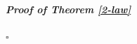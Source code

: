 \documentclass[10pt]{amsart}
\numberwithin{equation}{section}
\theoremstyle{plain}
\numberwithin{equation}{section}
\theoremstyle{definition}
\theoremstyle{remark}
\newenvironment{myproof}[2] {\paragraph{\emph{Proof of {#1} {#2} }}}{\hfill$\square$}
\def\ac{\mathrm{ac}}
\def\ur{\mathrm{ur}}
\def\ac{\mathrm{ac}}
\def\triplef{\underline{\mathbf{f}}}
\def\calO{\mathcal{O}}
\def\frakp{\mathfrak{p}}
\def\FF{\mathbf{F}}
\def\rmH{\mathrm{H}}
\def\rmM{\mathrm{M}}
\def\rmX{\mathrm{X}}
\def\rmXbar{\overline{\rmX}}
\newcommand{\Gr}{\mathbf{Gr}}
\begin{document}
\begin{myproof}{Theorem \ref{2-law}}{}


\end{myproof}
\end{document}
